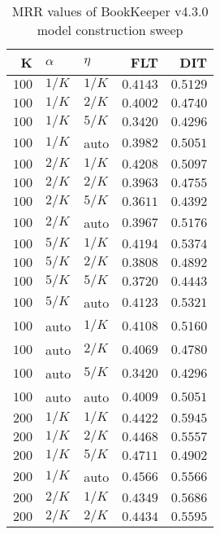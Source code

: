 
\begin{table}
\begin{spacing}{1.2}
\centering
\caption{MRR values of BookKeeper v4.3.0 model construction sweep}
\label{table:bookkeeper_model_sweep}
\vspace{0.2em}
\parbox{.45\linewidth}{\centering \begin{tabular}{rll|rr}
\toprule
    K &  $\alpha$ &    $\eta$ & FLT &   DIT \\
\midrule
$100$ &  $1/K$ &  $1/K$ &         $0.4143$ & $0.5129$ \\
$100$ &  $1/K$ &  $2/K$ &         $0.4002$ & $0.4740$ \\
$100$ &  $1/K$ &  $5/K$ &         $0.3420$ & $0.4296$ \\
$100$ &  $1/K$ &   auto &         $0.3982$ & $0.5051$ \\
$100$ &  $2/K$ &  $1/K$ &         $0.4208$ & $0.5097$ \\
$100$ &  $2/K$ &  $2/K$ &         $0.3963$ & $0.4755$ \\
$100$ &  $2/K$ &  $5/K$ &         $0.3611$ & $0.4392$ \\
$100$ &  $2/K$ &   auto &         $0.3967$ & $0.5176$ \\
$100$ &  $5/K$ &  $1/K$ &         $0.4194$ & $0.5374$ \\
$100$ &  $5/K$ &  $2/K$ &         $0.3808$ & $0.4892$ \\
$100$ &  $5/K$ &  $5/K$ &         $0.3720$ & $0.4443$ \\
$100$ &  $5/K$ &   auto &         $0.4123$ & $0.5321$ \\
$100$ &   auto &  $1/K$ &         $0.4108$ & $0.5160$ \\
$100$ &   auto &  $2/K$ &         $0.4069$ & $0.4780$ \\
$100$ &   auto &  $5/K$ &         $0.3420$ & $0.4296$ \\
$100$ &   auto &   auto &         $0.4009$ & $0.5051$ \\
$200$ &  $1/K$ &  $1/K$ &         $0.4422$ & $0.5945$ \\
$200$ &  $1/K$ &  $2/K$ &         $0.4468$ & $0.5557$ \\
$200$ &  $1/K$ &  $5/K$ &         $0.4711$ & $0.4902$ \\
$200$ &  $1/K$ &   auto &         $0.4566$ & $0.5566$ \\
$200$ &  $2/K$ &  $1/K$ &         $0.4349$ & $0.5686$ \\
$200$ &  $2/K$ &  $2/K$ &         $0.4434$ & $0.5595$ \\

\end{tabular}}
\end{spacing}
\end{table}
